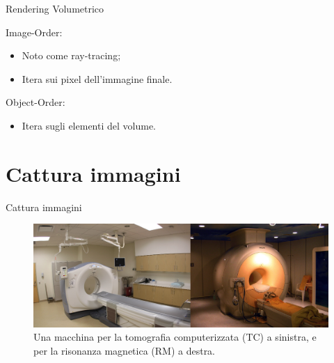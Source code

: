 \documentclass{beamer}
\begin{document}
\begin{frame}{Rendering Volumetrico}
	\begin{multicols}{2}
		Image-Order:
		\begin{itemize}
			\item Noto come ray-tracing;
			\item Itera sui pixel dell'immagine finale.
		\end{itemize}

		\columnbreak

		Object-Order:
		\begin{itemize}
			\item Itera sugli elementi del volume.
		\end{itemize}
	\end{multicols}
	
	\end{frame}
	
	
	\section{Cattura immagini}
	\begin{frame}{Cattura immagini}
	
	\begin{figure}[ht]
    	\centering
    	\includegraphics[width=1\textwidth]{Images/medicalscanners.png}
    	\caption{Una macchina per la tomografia computerizzata (TC) a sinistra, e per la risonanza magnetica (RM) a destra.}
	\end{figure}
	
	\end{frame}
	
	
\end{document}
